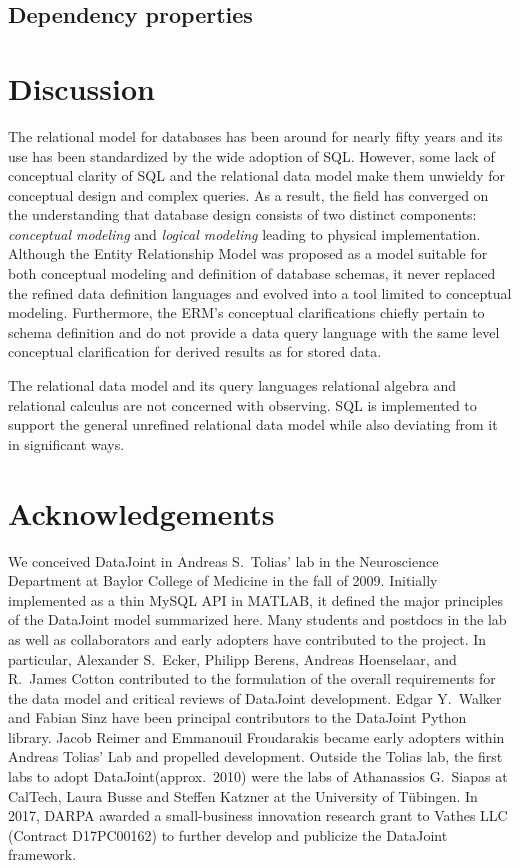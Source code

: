 \documentclass[letter,10pt]{article}
\newcommand{\datajoint}{DataJoint\xspace}
\begin{document}
\subsection{Dependency properties}

\section{Discussion}
The relational model for databases has been around for nearly fifty years and its use has been standardized by the wide adoption of SQL.
However, some lack of conceptual clarity of SQL and the relational data model make them unwieldy for conceptual design and complex queries.
As a result, the field has converged on the understanding that database design consists of two distinct components: \emph{conceptual modeling} and \emph{logical modeling} leading to physical implementation. 
Although the Entity Relationship Model was proposed as a model suitable for both conceptual modeling and definition of database schemas, it never replaced the refined data definition languages and evolved into a tool limited to conceptual modeling.  
Furthermore, the ERM's conceptual clarifications chiefly pertain to schema definition and do not provide a data query language with the same level conceptual clarification for derived results as for stored data.

The relational data model and its query languages relational algebra and relational calculus are not concerned with observing. 
SQL is implemented to support the general unrefined relational data model while also deviating from it in significant ways. 

\section{Acknowledgements}
We conceived \datajoint in Andreas S.\ Tolias' lab in the Neuroscience Department at Baylor College of Medicine in the fall of 2009. 
Initially implemented as a thin MySQL API in MATLAB, it defined the major principles of the \datajoint model summarized here. 
Many students and postdocs in the lab as well as collaborators and early adopters have contributed to the project.
In particular, Alexander S.\ Ecker, Philipp Berens, Andreas Hoenselaar, and R.\ James Cotton contributed to the formulation of the overall requirements for the data model and critical reviews of \datajoint development.
Edgar Y.\ Walker and Fabian Sinz have been principal contributors to the \datajoint Python library. 
Jacob Reimer and Emmanouil Froudarakis became early adopters within Andreas Tolias' Lab and propelled development.
Outside the Tolias lab, the first labs to adopt \datajoint (approx.\ 2010) were the labs of Athanassios G.\ Siapas at CalTech, Laura Busse and Steffen Katzner at the University of T\"ubingen.
In 2017, DARPA awarded a small-business innovation research grant to Vathes LLC (Contract D17PC00162) to further develop and publicize the \datajoint framework. 
\end{document}
